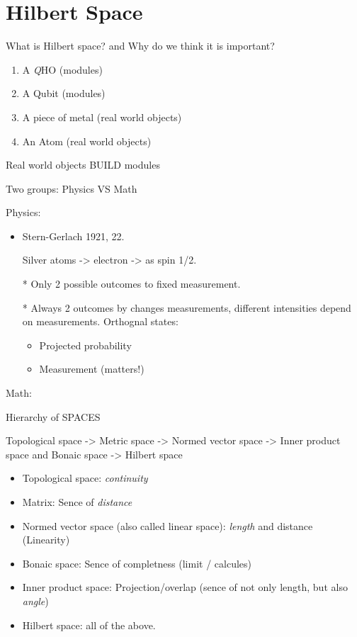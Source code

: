 
\chapter{Hilbert Space}

What is Hilbert space? and Why do we think it is important?

\begin{enumerate}
  \item A \emph{\fbox Q}\/HO (modules)
  \item A Qubit (modules)
  \item A piece of metal (real world objects)
  \item An Atom (real world objects)
\end{enumerate}
Real world objects BUILD modules

Two groups: Physics VS Math

Physics:
\begin{itemize}
  \item Stern-Gerlach 1921, 22.
  
  Silver atoms -> electron -> as spin 1/2.


  * Only 2 possible outcomes to fixed measurement.

  * Always 2 outcomes by changes measurements, different intensities depend on measurements.
  Orthognal states:
  \begin{itemize}
    \item Projected probability
    \item Measurement (matters!)
  \end{itemize}
\end{itemize}

Math:

Hierarchy of SPACES

Topological space -> Metric space -> Normed vector space -> Inner product space and Bonaic space -> Hilbert space
\begin{itemize}
  \item Topological space: \emph{continuity}
  \item Matrix: Sence of \emph{distance}
  \item Normed vector space (also called linear space): \emph{length} and distance (Linearity)
  \item Bonaic space: Sence of completness (limit / calcules)
  \item Inner product space: Projection/overlap (sence of not only length, but also \emph{angle})
  \item Hilbert space: all of the above.
\end{itemize}

